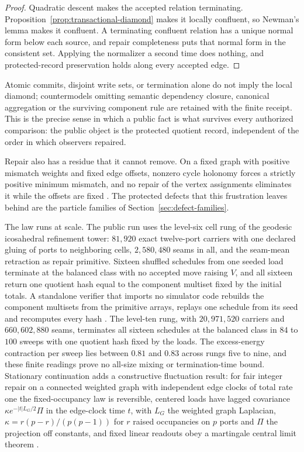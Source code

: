 \documentclass[11pt]{article}
\theoremstyle{definition}
\theoremstyle{remark}
\begin{document}
\begin{proof}
Quadratic descent makes the accepted relation terminating.
Proposition~\ref{prop:transactional-diamond} makes it locally confluent, so
Newman's lemma \cite{newman42} makes it confluent. A terminating confluent
relation has a unique normal form below each source, and repair completeness
puts that normal form in the consistent set. Applying the normalizer a second
time does nothing, and protected-record preservation holds along every
accepted edge.
\end{proof}

Atomic commits, disjoint write sets, or termination alone do not imply the
local diamond; countermodels omitting semantic dependency closure, canonical
aggregation or the surviving component rule are retained with the finite
receipt. This is the precise sense in which a public fact is what survives
every authorized comparison: the public object is the protected quotient
record, independent of the order in which observers repaired.

Repair also has a residue that it cannot remove. On a fixed graph with
positive mismatch weights and fixed edge offsets, nonzero cycle holonomy
forces a strictly positive minimum mismatch, and no repair of the vertex
assignments eliminates it while the offsets are fixed \cite{ophconsensus}.
The protected defects that this frustration leaves behind are the particle
families of Section~\ref{sec:defect-families}.

The law runs at scale. The public run uses the level-six cell rung of the
geodesic icosahedral refinement tower: $81{,}920$ exact twelve-port carriers
with one declared gluing of ports to neighboring cells, $2{,}580{,}480$
seams in all, and the seam-mean retraction as repair primitive. Sixteen
shuffled schedules from one seeded load terminate at the balanced class with
no accepted move raising $V$, and all sixteen return one quotient hash equal to the component multiset fixed by the initial totals.
A standalone verifier that imports no simulator code rebuilds the component
multisets from the primitive arrays, replays one schedule from its seed and
recomputes every hash \cite{ophsim}. The level-ten rung, with $20{,}971{,}520$ carriers and $660{,}602{,}880$ seams,
terminates all sixteen schedules at the balanced class in $84$ to $100$ sweeps
with one quotient hash fixed by the loads. The excess-energy contraction per sweep lies between $0.81$ and $0.83$ across rungs five to nine, and these finite readings prove no all-size mixing or termination-time bound. Stationary continuation adds a
constructive fluctuation result: for fair integer repair on a connected
weighted graph with independent edge clocks of total rate one the fixed-occupancy law is reversible, centered loads have lagged covariance $\kappa e^{-|t|L_G/2}\Pi$ in the edge-clock time $t$, with $L_G$ the weighted graph Laplacian,
$\kappa=r(p-r)/(p(p-1))$ for $r$ raised occupancies on $p$ ports and $\Pi$ the
projection off constants, and fixed linear readouts obey a martingale central
limit theorem \cite{ophMicrophysics}.
\end{document}
